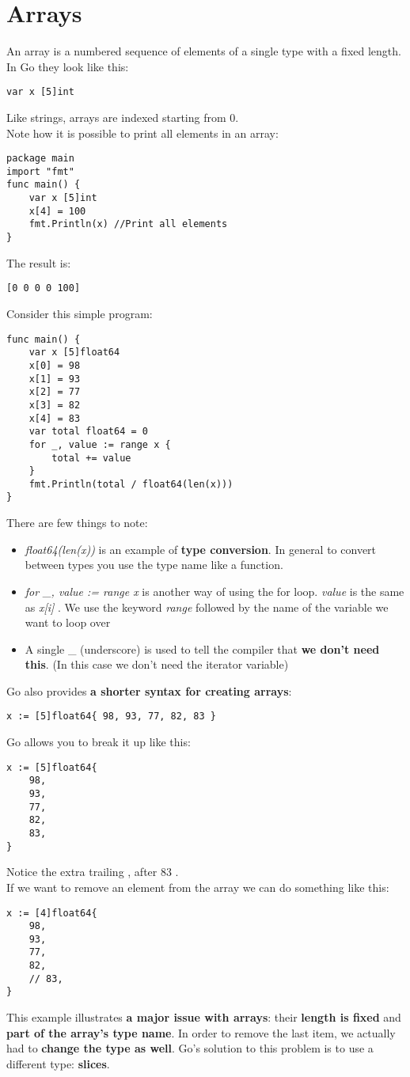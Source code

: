 \documentclass[10pt,letterpaper]{report}
\begin{document}
\section{Arrays}
An array is a numbered sequence of elements of a single type with a fixed length. In Go they look like this:
\begin{lstlisting}
var x [5]int
\end{lstlisting}
Like strings, arrays are indexed starting from 0.\\
Note how it is possible to print all elements in an array:
\begin{lstlisting}
package main
import "fmt"
func main() {
	var x [5]int
	x[4] = 100
	fmt.Println(x) //Print all elements
}
\end{lstlisting}
The result is:
\begin{lstlisting}
[0 0 0 0 100]
\end{lstlisting}
Consider this simple program:
\begin{lstlisting}
func main() {
	var x [5]float64
	x[0] = 98
	x[1] = 93
	x[2] = 77
	x[3] = 82
	x[4] = 83
	var total float64 = 0
	for _, value := range x {
		total += value
	}
	fmt.Println(total / float64(len(x)))
}	
\end{lstlisting}
There are few things to note:
\begin{itemize}
\item \textit{float64(len(x))} is an example of \textbf{type conversion}. In general to convert between types you use the type name like a function.
\item \textit{for \_, value := range x} is another way of using the for loop. \textit{value} is the same as \textit{x[i]} . We use the keyword \textit{range} followed by the name of the variable we want to loop over
\item A single \_ (underscore) is used to tell the compiler that \textbf{we don't need this}. (In this case we don't need the iterator variable)
\end{itemize}
Go also provides \textbf{a shorter syntax for creating arrays}:
\begin{lstlisting}
x := [5]float64{ 98, 93, 77, 82, 83 }
\end{lstlisting}
Go allows you to break it up like this:
\begin{lstlisting}
x := [5]float64{
	98,
	93,
	77,
	82,
	83,
}
\end{lstlisting}
Notice the extra trailing , after 83 .\\
If we want to remove an element from the array we can do something like this:
\begin{lstlisting}
x := [4]float64{
	98,
	93,
	77,
	82,
	// 83,
}
\end{lstlisting}
This example illustrates \textbf{a major issue with arrays}: their \textbf{length is fixed} and \textbf{part of the array's type name}. In order to remove the last item, we actually had to \textbf{change the type as well}. Go's solution to this problem is to use a different type: \textbf{slices}.
\end{document}
